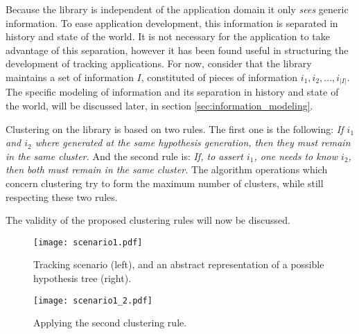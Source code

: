 Because the library is independent of the application domain it only \textit{sees} generic information. To ease application development, this information is separated in history and state of the world. It is not necessary for the application to take advantage of this separation, however it has been found useful in structuring the development of tracking applications. For now, consider that the library maintains a set of information $I$, constituted of pieces of information $i_1, i_2, ..., i_{|I|}$. The specific modeling of information and its separation in history and state of the world, will be discussed later, in section \ref{sec:information_modeling}.

Clustering on the library is based on two rules. The first one is the following:
\textit{If $i_1$ and $i_2$ where generated at the same hypothesis generation, then they must remain in the same cluster.}
And the second rule is:
\textit{If, to assert $i_1$, one needs to know $i_2$, then both must remain in the same cluster.}
The algorithm operations which concern clustering try to form the maximum number of clusters, while still respecting these two rules.

The validity of the proposed clustering rules will now be discussed.

\ifx \ommitimages  \undefined
\begin{figure}
\begin{minipage}[b]{0.6\textwidth}
    \centering
    \texttt{[image: scenario1.pdf]}
    \caption{Tracking scenario (left), and an abstract representation of a possible hypothesis tree (right).}
    \label{fig:single_track}
\end{minipage}
\hspace{0\textwidth}
\begin{minipage}[b]{0.4\textwidth}
	\centering
	\texttt{[image: scenario1\_2.pdf]}
	\caption{Applying the second clustering rule.}
	\label{fig:second_rule2}
\end{minipage}
\end{figure}
\fi


